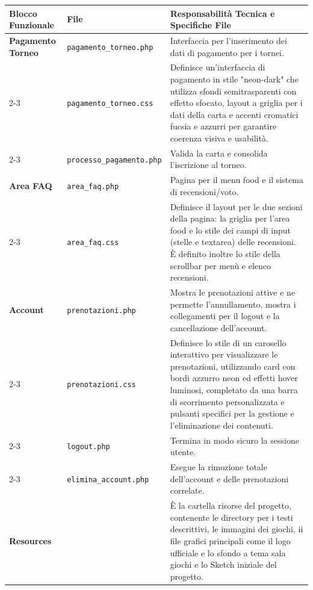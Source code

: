 \documentclass[a4paper, twoside]{report}
\begin{document}
\begin{tabularx}{\textwidth}{|l|X|X|}
\hline
\rowcolor{lightgray} \textbf{Blocco Funzionale} & \textbf{File} & \textbf{Responsabilità Tecnica e Specifiche File} \\ \hline
\cellcolor{red!50!white} \textbf{Pagamento Torneo} & \texttt{pagamento\_torneo.php} & Interfaccia per l'inserimento dei dati di pagamento per i tornei. \\ \cline{2-3}
\cellcolor{red!50!white} & \texttt{pagamento\_torneo.css} & Definisce un'interfaccia di pagamento in stile "neon-dark" che utilizza sfondi semitrasparenti con effetto sfocato, layout a griglia per i dati della carta e accenti cromatici fucsia e azzurri per garantire coerenza visiva e usabilità. \\ \cline{2-3}
\cellcolor{red!50!white} & \texttt{processo\_pagamento.php} & Valida la carta e consolida l'iscrizione al torneo. \\ \hline

\cellcolor{orange!50!white} \textbf{Area FAQ} & \texttt{area\_faq.php} & Pagina per il menu food e il sistema di recensioni/voto. \\ \cline{2-3}
\cellcolor{orange!50!white} & \texttt{area\_faq.css} & Definisce il layout per le due sezioni della pagina: la griglia per l’area food e lo stile dei campi di input (stelle e textarea) delle recensioni. È definito inoltre lo stile della scrollbar per menù e elenco recensioni. \\ \hline

\cellcolor{violet!50!white} \textbf{Account} & \texttt{prenotazioni.php} & Mostra le prenotazioni attive e ne permette l’annullamento, mostra i collegamenti per il logout e la cancellazione dell’account.\\ \cline{2-3}
\cellcolor{violet!50!white} & \texttt{prenotazioni.css} & Definisce lo stile di un carosello interattivo per visualizzare le prenotazioni, utilizzando card con bordi azzurro neon ed effetti hover luminosi, completato da una barra di scorrimento personalizzata e pulsanti specifici per la gestione e l'eliminazione dei contenuti.\\ \cline{2-3}
\cellcolor{violet!50!white} & \texttt{logout.php} & Termina in modo sicuro la sessione utente.\\ \cline{2-3}
\cellcolor{violet!50!white} & \texttt{elimina\_account.php} & Esegue la rimozione totale dell'account e delle prenotazioni correlate.\\ \hline

\cellcolor{gray} \textbf{Resources} && È la cartella risorse del progetto, contenente le directory per i testi descrittivi, le immagini dei giochi, ii file grafici principali come il logo ufficiale e lo sfondo a tema sala giochi e lo Sketch iniziale del progetto. \\ \hline
\end{tabularx}
\renewcommand{\arraystretch}{1}
\end{document}
